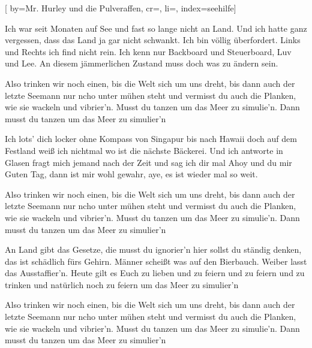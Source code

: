 
[%
    by={Mr. Hurley und die Pulveraffen},
    cr={},
    li={},
    index={seehilfe}]


    \label{seehilfe}

    \beginverse\memorize[verse]
        Ich war seit Monaten auf See
        und fast so lange nicht an Land.
        Und ich hatte ganz vergessen,
        dass das Land ja gar nicht schwankt.
        Ich bin völlig überfordert.
        Links und Rechts ich find nicht rein.
        Ich kenn nur Backboard und Steuerboard,
        Luv und Lee.
        An diesem jämmerlichen Zustand muss doch was zu ändern sein.
    \endverse

    \beginchorus\memorize[chorus]
        Also trinken wir noch einen, bis die Welt sich um uns dreht,
        bis dann auch der letzte Seemann nur ncho unter mühen steht
        und vermisst du auch die Planken, wie sie wackeln und vibrier'n.
        Musst du tanzen um das Meer zu simulie'n.
        Dann musst du tanzen um das Meer zu simulier'n
    \endchorus

    \beginverse\replay[verse]
        Ich lots' dich locker ohne Kompass
        von Singapur bis nach Hawaii
        doch auf dem Festland weiß ich nichtmal
        wo ist die nächste Bäckerei.
        Und ich antworte in Glasen
        fragt mich jemand nach der Zeit
        und sag ich dir mal Ahoy und du mir Guten Tag,
        dann ist mir wohl gewahr,
        aye, es ist wieder mal so weit.
    \endverse

    \beginchorus\replay[chorus]
        Also trinken wir noch einen, bis die Welt sich um uns dreht,
        bis dann auch der letzte Seemann nur ncho unter mühen steht
        und vermisst du auch die Planken, wie sie wackeln und vibrier'n.
        Musst du tanzen um das Meer zu simulie'n.
        Dann musst du tanzen um das Meer zu simulier'n
    \endchorus

    \beginverse\replay[verse]
        An Land gibt das Gesetze,
        die musst du ignorier'n
        hier sollst du ständig denken,
        das ist schädlich fürs Gehirn.
        Männer scheißt was auf den Bierbauch.
        Weiber lasst das Ausstaffier'n.
        Heute gilt es Euch zu lieben und zu feiern und zu feiern und zu trinken und natürlich noch zu feiern um das Meer zu simulier'n
    \endverse

    \beginchorus\replay[chorus]
        Also trinken wir noch einen, bis die Welt sich um uns dreht,
        bis dann auch der letzte Seemann nur ncho unter mühen steht
        und vermisst du auch die Planken, wie sie wackeln und vibrier'n.
        Musst du tanzen um das Meer zu simulie'n.
        Dann musst du tanzen um das Meer zu simulier'n
    \endchorus
\endsong
